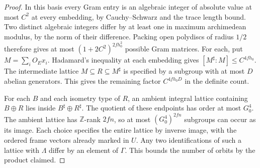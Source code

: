 \documentclass[a4paper,11pt]{article}
\theoremstyle{definition}
\theoremstyle{remark}
\numberwithin{equation}{section}
\begin{document}
\begin{proof}
In this basis every Gram entry is an algebraic integer of
absolute value at most \(C^2\) at every embedding, by
Cauchy--Schwarz and the trace length bound. Two distinct
algebraic integers differ by at least one in maximum
archimedean modulus, by the norm of their difference.
Packing open polydiscs of radius \(1/2\) therefore gives at
most \((1+2C^2)^{2fh_0^2}\) possible Gram matrices. For
each, put \(M=\sum_i O_Ex_i\). Hadamard's inequality at
each embedding gives
\([M^\sharp:M]\le C^{4fh_0}\). The intermediate lattice
\(M\subseteq R\subseteq M^\sharp\) is specified by a
subgroup with at most \(D\) abelian generators. This gives
the remaining factor \(C^{4fh_0D}\) in the definite count.

For each \(B\) and each isometry type of \(R\), an ambient
integral lattice containing \(B\oplus R\) lies inside
\(B^\sharp\oplus R^\sharp\). The quotient of these endpoints
has order at most \(G_0^4\). The ambient lattice has
\(\mathbb Z\)-rank \(2fn\), so at most
\((G_0^4)^{2fn}\) subgroups can occur as its image.
Each choice specifies the entire lattice by inverse image,
with the ordered frame vectors already marked in \(U\).
Any two identifications of such a lattice with \(\Lambda\)
differ by an element of \(\Gamma\). This bounds the number
of orbits by the product claimed.
\end{proof}
\end{document}
